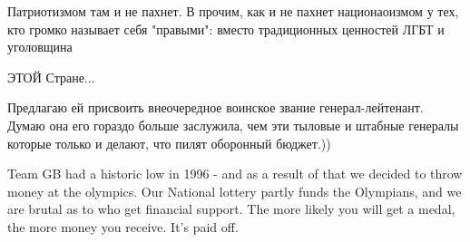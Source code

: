 \begin{itemize}
 

Патриотизмом там и не пахнет. В прочим, как и не пахнет национаоизмом у тех,
кто громко называет себя "правыми": вместо традиционных ценностей ЛГБТ и
уголовщина


 
ЭТОЙ Стране...

 

Предлагаю ей присвоить внеочередное воинское звание генерал-лейтенант. Думаю
она его гораздо больше заслужила, чем эти тыловые и штабные генералы которые
только и делают, что пилят оборонный бюджет.))


 

Team GB had a historic low in 1996 - and as a result of that we decided to
throw money at the olympics. Our National lottery partly funds the Olympians,
and we are brutal as to who get financial support. The more likely you will get
a medal, the more money you receive. It’s paid off.
\end{itemize}

